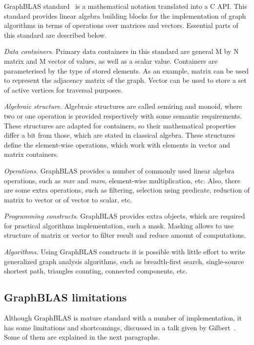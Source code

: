 GraphBLAS standard~\cite{7761646} is a mathematical notation translated into a C API. This standard provides linear algebra building blocks for the implementation of graph algorithms in terms of operations over matrices and vectors. Essential parts of this standard are described below.

\textit{Data containers}. Primary data containers in this standard are general M by N matrix and M vector of values, as well as a scalar value. Containers are parameterised by the type of stored elements. As an example, matrix can be used to represent the adjacency matrix of the graph. Vector can be used to store a set of active vertices for traversal purposes. 

\textit{Algebraic structure}. Algebraic structures are called semiring and monoid, where two or one operation is provided respectively with some semantic requirements. These structures are adapted for containers, so their mathematical properties differ a bit from those, which are stated in classical algebra. These structures define the element-wise operations, which work with elements in vector and matrix containers. 

\textit{Operations.} GraphBLAS provides a number of commonly used linear algebra operations, such as \textit{mxv} and \textit{mxm}, element-wise multiplication, etc. Also, there are some extra operations, such as filtering, selection using predicate, reduction of matrix to vector or of vector to scalar, etc.

\textit{Programming constructs}. GraphBLAS provides extra objects, which are required for practical algorithms implementation, such a mask. Masking allows to use structure of matrix or vector to filter result and reduce amount of computations.

\textit{Algorithms.} Using GraphBLAS constructs it is possible with little effort to write generalized graph analysis algorithms, such as breadth-first search, single-source shortest path, triangles counting, connected components, etc.

\subsection{GraphBLAS limitations}

Although GraphBLAS is mature standard with a number of implementation, it has some limitations and shortcomings, discussed in a talk given by Gilbert~\cite{talk:graphblas_did_wrong}. Some of them are explained in the next paragraphs. 

